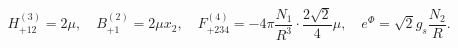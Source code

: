 \begin{equation}       
H^{(3)}_{+12} = 2 \mu, \quad B^{(2)}_{+1} = 2 \mu x_2,
\quad 
F^{(4)}_{+234} = - 4 \pi \frac{N_1}{R^3} \cdot \frac{2 \sqrt{2}}{4} \mu,
\quad
e^{\Phi} = \sqrt{2} g_s \frac{N_2}{R}.
\end{equation}

